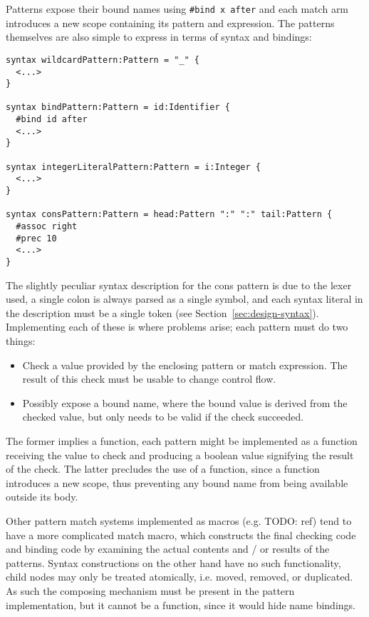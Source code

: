 \documentclass{kththesis}
\begin{document}
Patterns expose their bound names using \texttt{#bind x after} and each match arm introduces a new scope containing its pattern and expression. The patterns themselves are also simple to express in terms of syntax and bindings:

\begin{verbatim}
syntax wildcardPattern:Pattern = "_" {
  <...>
}

syntax bindPattern:Pattern = id:Identifier {
  #bind id after
  <...>
}

syntax integerLiteralPattern:Pattern = i:Integer {
  <...>
}

syntax consPattern:Pattern = head:Pattern ":" ":" tail:Pattern {
  #assoc right
  #prec 10
  <...>
}
\end{verbatim}


The slightly peculiar syntax description for the cons pattern is due to the lexer used, a single colon is always parsed as a single symbol, and each syntax literal in the description must be a single token (see Section~\ref{sec:design-syntax}). Implementing each of these is where problems arise; each pattern must do two things:

\begin{itemize}
  \item Check a value provided by the enclosing pattern or match expression. The result of this check must be usable to change control flow.
  \item Possibly expose a bound name, where the bound value is derived from the checked value, but only needs to be valid if the check succeeded.
\end{itemize}

The former implies a function, each pattern might be implemented as a function receiving the value to check and producing a boolean value signifying the result of the check. The latter precludes the use of a function, since a function introduces a new scope, thus preventing any bound name from being available outside its body.

Other pattern match systems implemented as macros (e.g. TODO: ref) tend to have a more complicated match macro, which constructs the final checking code and binding code by examining the actual contents and / or results of the patterns. Syntax constructions on the other hand have no such functionality, child nodes may only be treated atomically, i.e. moved, removed, or duplicated. As such the composing mechanism must be present in the pattern implementation, but it cannot be a function, since it would hide name bindings.
\end{document}
